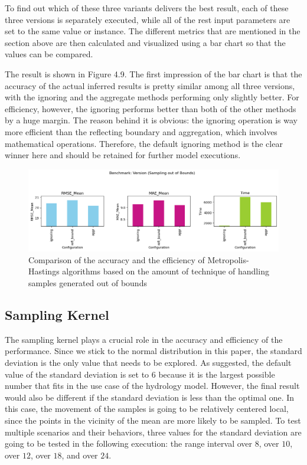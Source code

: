 To find out which of these three variants delivers the best result, each of these three versions is separately executed, while all of the rest input parameters are set to the same value or instance. The different metrics that are mentioned in the section above are then calculated and visualized using a bar chart so that the values can be compared. 

The result is shown in Figure 4.9. The first impression of the bar chart is that the accuracy of the actual inferred results is pretty similar among all three versions, with the ignoring and the aggregate methods performing only slightly better. For efficiency, however, the ignoring performs better than both of the other methods by a huge margin. The reason behind it is obvious: the ignoring operation is way more efficient than the reflecting boundary and aggregation, which involves mathematical operations. Therefore, the default ignoring method is the clear winner here and should be retained for further model executions.


\begin{figure}[H]
    \centering
    \includegraphics[width=1\textwidth]{figures/basic_mh/benchmark/sampling_otb.png}
    \captionsetup{width=.8\textwidth}
    \caption{Comparison of the accuracy and the efficiency of Metropolis-Hastings algorithms based on the amount of technique of handling samples generated out of bounds}
    \label{fig:enter-label}
\end{figure}



\subsection{Sampling Kernel}
The sampling kernel plays a crucial role in the accuracy and efficiency of the performance. Since we stick to the normal distribution in this paper, the standard deviation is the only value that needs to be explored. As suggested, the default value of the standard deviation is set to $6$ because it is the largest possible number that fits in the use case of the hydrology model. However, the final result would also be different if the standard deviation is less than the optimal one. In this case, the movement of the samples is going to be relatively centered local, since the points in the vicinity of the mean are more likely to be sampled. To test multiple scenarios and their behaviors, three values for the standard deviation are going to be tested in the following execution: the range interval over $8$, over $10$, over $12$, over $18$, and over $24$.

